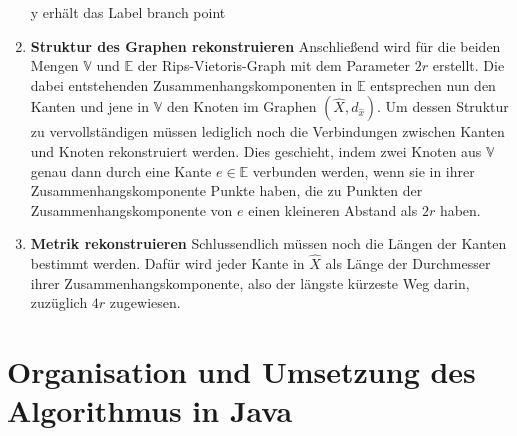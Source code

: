 \documentclass[parskip=half,
 fontsize=12pt, bibtotoc,
 ngerman]
 {article}
\begin{document}
\begin{enumerate}
\begin{algorithm}
\begin{algorithmic}
		\STATE y erhält das Label branch point
	\ENDIF
\ENDFOR
\end{algorithmic}
\end{algorithm}
\item \textbf{Struktur des Graphen rekonstruieren}\newline
Anschlie{\ss}end wird für die beiden Mengen $\mathbb{V}$ und $\mathbb{E}$ der Rips-Vietoris-Graph mit dem Parameter $2r$ erstellt. Die dabei entstehenden Zusammenhangskomponenten in $\mathbb{E}$ entsprechen nun den Kanten und jene in $\mathbb{V}$ den Knoten im Graphen $(\hat{X}, d_{\hat{x}})$. Um dessen Struktur zu vervollständigen müssen lediglich noch die Verbindungen zwischen Kanten und Knoten rekonstruiert werden. Dies geschieht, indem zwei Knoten aus  $\mathbb{V}$ genau dann durch eine Kante $e \in \mathbb{E}$ verbunden werden, wenn sie in ihrer Zusammenhangskomponente Punkte haben, die zu Punkten der Zusammenhangskomponente von $e$ einen kleineren Abstand als $2r$ haben.

\item \textbf{Metrik rekonstruieren}\newline
Schlussendlich müssen noch die Längen der Kanten bestimmt werden. Dafür wird jeder Kante in $\hat{X}$ als Länge der Durchmesser ihrer Zusammenhangskomponente, also der längste kürzeste Weg darin, zuzüglich $4r$ zugewiesen.
\end{enumerate} 



\section{Organisation und Umsetzung des Algorithmus in Java}
\end{document}
